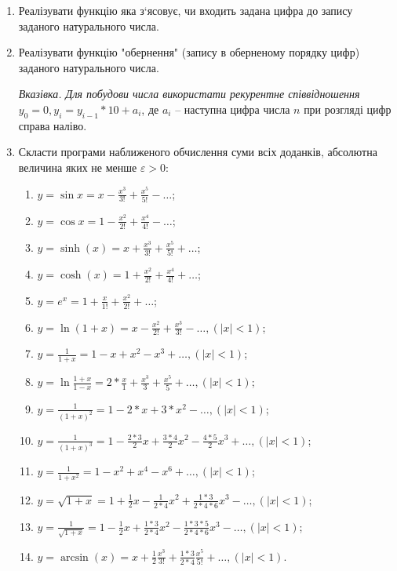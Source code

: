 \documentclass[a5paper,titlepage,openany,twoside,draft]{book_unv}%
\makeatletter
\newcommand{\xslalph}[1]{\expandafter\@xslalph\csname c@#1\endcsname}
\newcommand{\@xslalph}[1]{%
    \ifcase#1\or а\or б\or в\or г\or д\or e\or є\or ж\or з\or i%
    \or й\or к\or л\or м\or н\or о\or п\or р\or с\or т%
    \or у\or ф\or х\or ц\or ч\or ш\or ю\or я\or аа\or бб\or вв%
    \else\@ctrerr\fi%
}
\makeatother
\begin{document}
\begin{enumerate}
\begin{enumerate}[label=\xslalph*)]
\end{enumerate}

\item
  Реалізувати функцію яка з`ясовує, чи входить задана цифра до запису
  заданого натурального числа.
\item
  Реалізувати функцію "обернення" (запису в оберненому порядку цифр)
  заданого натурального числа.

\emph{\emph{Вказівка. Для побудови числа використати рекурентне
співвідношення}} \(y_{0} = 0,y_{i} = y_{i - 1}*10 + a_{i}\), де
\(a_{i}\) -- наступна цифра числа \(n\) при розгляді цифр
справа наліво.

\item
  Скласти програми наближеного обчислення суми всіх доданків, абсолютна
  величина яких не менше $\varepsilon > 0 $:
\begin{enumerate}[label=\xslalph*)]
\item \(y = \sin x = x - \frac{x^{3}}{3!} + \frac{x^{5}}{5!} - \ldots\);
\item \(y = \cos x = 1 - \frac{x^{2}}{2!} + \frac{x^{4}}{4!} - \ldots\);
\item
\(y = \sinh (x) = x + \frac{x^{3}}{3!} + \frac{x^{5}}{5!} + \ldots\);
\item 
\(y = \cosh (x) = 1 + \frac{x^{2}}{2!} + \frac{x^{4}}{4!} + \ldots\);
\item \(y = e^{x} = 1 + \frac{x}{1!} + \frac{x^{2}}{2!} + \ldots\);
\item
\(y = \ln(1 + x) = x - \frac{x^{2}}{2!} + \frac{x^{3}}{3!} - \ldots,(\left| x \right| < 1)\);
\item
\(y = \frac{1}{1 + x} = 1 - x + x^{2} - x^{3} + \ldots,(\left| x \right| < 1)\);
\item
\(y = \ln\frac{1 + x}{1 - x} = 2*\frac{x}{1} + \frac{x^{3}}{3} + \frac{x^{5}}{5} + \ldots, (\left| x \right| < 1)\);
\item
\(y = \frac{1}{(1 + x)^{2}} = 1 - 2*x + 3*x^{2} - \ldots,(\left| x \right| < 1)\);
\item
\(y = \frac{1}{(1 + x)^{3}} = 1 - \frac{2*3}{2}x + \frac{3*4}{2}x^{2} - \frac{4*5}{2}x^{3} + \ldots,(\left| x \right| < 1)\);
\item
\(y = \frac{1}{1 + x^{2}} = 1 - x^{2} + x^{4} - x^{6} + \ldots,(\left| x \right| < 1)\);
\item
\(y = \sqrt{1 + x} = 1 + \frac{1}{2}x - \frac{1}{2*4}x^{2} + \frac{1*3}{2*4*6}x^{3} - \ldots,(\left| x \right| < 1)\);
\item
\(y = \frac{1}{\sqrt{1 + x}} = 1 - \frac{1}{2}x + \frac{1*3}{2*4}x^{2} - \frac{1*3*5}{2*4*6}x^{3} - \ldots,(\left| x \right| < 1)\);
\item
\(y = \arcsin (x) = x + \frac{1}{2}\frac{x^{3}}{3!} + \frac{1*3}{2*4}\frac{x^{5}}{5!} + \ldots,(\left| x \right| < 1)\).


\end{enumerate}
\end{enumerate}
\end{document}
